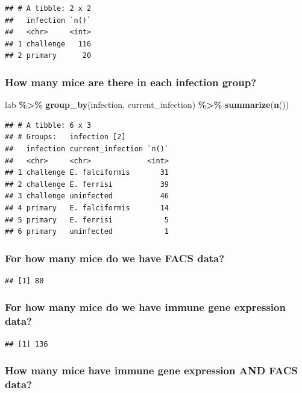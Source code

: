 \documentclass[
]{article}
\newenvironment{Shaded}{\begin{snugshade}}{\end{snugshade}}
\newcommand{\FunctionTok}[1]{\textcolor[rgb]{0.13,0.29,0.53}{\textbf{#1}}}
\newcommand{\NormalTok}[1]{#1}
\newcommand{\SpecialCharTok}[1]{\textcolor[rgb]{0.81,0.36,0.00}{\textbf{#1}}}
\begin{document}
\begin{verbatim}
## # A tibble: 2 x 2
##   infection `n()`
##   <chr>     <int>
## 1 challenge   116
## 2 primary      20
\end{verbatim}

\subsubsection{How many mice are there in each infection
group?}\label{how-many-mice-are-there-in-each-infection-group}

\begin{Shaded}
\begin{Highlighting}[]
\NormalTok{lab }\SpecialCharTok{\%\textgreater{}\%}
    \FunctionTok{group\_by}\NormalTok{(infection, current\_infection) }\SpecialCharTok{\%\textgreater{}\%}
    \FunctionTok{summarize}\NormalTok{(}\FunctionTok{n}\NormalTok{())}
\end{Highlighting}
\end{Shaded}

\begin{verbatim}
## # A tibble: 6 x 3
## # Groups:   infection [2]
##   infection current_infection `n()`
##   <chr>     <chr>             <int>
## 1 challenge E. falciformis       31
## 2 challenge E. ferrisi           39
## 3 challenge uninfected           46
## 4 primary   E. falciformis       14
## 5 primary   E. ferrisi            5
## 6 primary   uninfected            1
\end{verbatim}

\subsubsection{For how many mice do we have FACS
data?}\label{for-how-many-mice-do-we-have-facs-data}

\begin{verbatim}
## [1] 80
\end{verbatim}

\subsubsection{For how many mice do we have immune gene expression
data?}\label{for-how-many-mice-do-we-have-immune-gene-expression-data}

\begin{verbatim}
## [1] 136
\end{verbatim}

\subsubsection{How many mice have immune gene expression AND FACS
data?}\label{how-many-mice-have-immune-gene-expression-and-facs-data}
\end{document}
